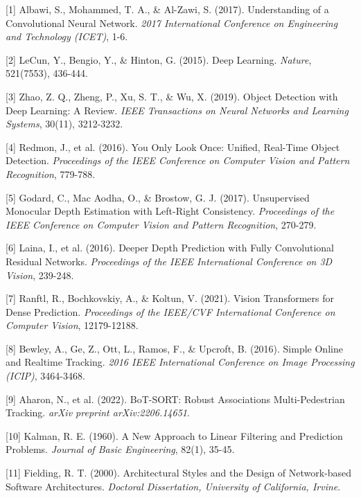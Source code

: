 \documentclass[12pt,a4paper]{report}
\begin{document}
\begin{thebibliography}{99}

[1] Albawi, S., Mohammed, T. A., \& Al-Zawi, S. (2017). Understanding of a Convolutional Neural Network. \textit{2017 International Conference on Engineering and Technology (ICET)}, 1-6.

[2] LeCun, Y., Bengio, Y., \& Hinton, G. (2015). Deep Learning. \textit{Nature}, 521(7553), 436-444.

[3] Zhao, Z. Q., Zheng, P., Xu, S. T., \& Wu, X. (2019). Object Detection with Deep Learning: A Review. \textit{IEEE Transactions on Neural Networks and Learning Systems}, 30(11), 3212-3232.

[4] Redmon, J., et al. (2016). You Only Look Once: Unified, Real-Time Object Detection. \textit{Proceedings of the IEEE Conference on Computer Vision and Pattern Recognition}, 779-788.

[5] Godard, C., Mac Aodha, O., \& Brostow, G. J. (2017). Unsupervised Monocular Depth Estimation with Left-Right Consistency. \textit{Proceedings of the IEEE Conference on Computer Vision and Pattern Recognition}, 270-279.

[6] Laina, I., et al. (2016). Deeper Depth Prediction with Fully Convolutional Residual Networks. \textit{Proceedings of the IEEE International Conference on 3D Vision}, 239-248.

[7] Ranftl, R., Bochkovskiy, A., \& Koltun, V. (2021). Vision Transformers for Dense Prediction. \textit{Proceedings of the IEEE/CVF International Conference on Computer Vision}, 12179-12188.

[8] Bewley, A., Ge, Z., Ott, L., Ramos, F., \& Upcroft, B. (2016). Simple Online and Realtime Tracking. \textit{2016 IEEE International Conference on Image Processing (ICIP)}, 3464-3468.

[9] Aharon, N., et al. (2022). BoT-SORT: Robust Associations Multi-Pedestrian Tracking. \textit{arXiv preprint arXiv:2206.14651}.

[10] Kalman, R. E. (1960). A New Approach to Linear Filtering and Prediction Problems. \textit{Journal of Basic Engineering}, 82(1), 35-45.

[11] Fielding, R. T. (2000). Architectural Styles and the Design of Network-based Software Architectures. \textit{Doctoral Dissertation, University of California, Irvine}.


\end{thebibliography}
\end{document}
